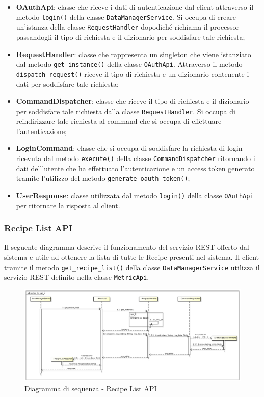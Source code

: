     \begin{itemize}
        \item \textbf{OAuthApi}: classe che riceve i dati di autenticazione dal client attraverso il metodo \texttt{login()} della classe \texttt{DataManagerService}. Si occupa di creare un'istanza della classe \texttt{RequestHandler} dopodiché richiama il processor passandogli il tipo di richiesta e il dizionario per soddisfare tale richiesta;
        \item \textbf{RequestHandler}: classe che rappresenta un singleton che viene istanziato dal metodo \texttt{get\_instance()} della classe \texttt{OAuthApi}. Attraverso il metodo \texttt{dispatch\_request()} riceve il tipo di richiesta e un dizionario contenente i dati per soddisfare tale richiesta;
        \item \textbf{CommandDispatcher}: classe che riceve il tipo di richiesta e il dizionario per soddisfare tale richiesta dalla classe \texttt{RequestHandler}. Si occupa di reindirizzare tale richiesta al command che si occupa di effettuare l'autenticazione;
        \item \textbf{LoginCommand}: classe che si occupa di soddisfare la richiesta di login ricevuta dal metodo \texttt{execute()} della classe \texttt{CommandDispatcher} ritornando i dati dell'utente che ha effettuato l'autenticazione e un access token generato tramite l'utilizzo del metodo \texttt{generate\_oauth\_token()};
        \item \textbf{UserResponse}: classe utilizzata dal metodo \texttt{login()} della classe \texttt{OAuthApi} per ritornare la risposta al client.
    \end{itemize}


	\subsubsection{Recipe List API} %
    \label{ssub:recipe_list_api}
    Il seguente diagramma descrive il funzionamento del servizio REST offerto dal sistema e utile ad ottenere la lista di tutte le Recipe presenti nel sistema. Il client tramite il metodo \texttt{get\_recipe\_list()} della classe \texttt{DataManagerService} utilizza il servizio REST definito nella classe \texttt{MetricApi}. \newline

    \begin{figure}[!htbp]
		\centering
			\centerline{\includegraphics[angle=90, scale=0.4]{./images/sequence_diagram/recipe_list_api.pdf}}
		\caption{Diagramma di sequenza - Recipe List API}
	\end{figure}


